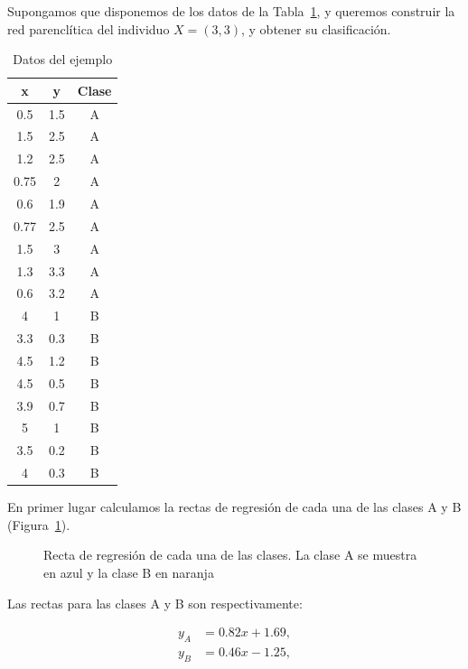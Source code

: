 \begin{ejemplo}
	Supongamos que disponemos de los datos de la Tabla~\ref{tbl:ejemploredparenclitica}, y queremos construir la red parenclítica del individuo $X = (3,3)$, y obtener su clasificación.\\
	
	\begin{table}[htbp!]
		\centering
		\caption{Datos del ejemplo}
		\label{tbl:ejemploredparenclitica}
		\begin{tabular}{@{}ccc@{}}
			\toprule
			x    & y   & Clase \\ \midrule
			0.5  & 1.5 & A     \\
			1.5  & 2.5 & A     \\
			1.2  & 2.5 & A     \\
			0.75 & 2   & A     \\
			0.6  & 1.9 & A     \\
			0.77 & 2.5 & A     \\
			1.5  & 3   & A     \\
			1.3  & 3.3 & A     \\
			0.6  & 3.2 & A     \\
			4    & 1   & B     \\
			3.3  & 0.3 & B     \\
			4.5  & 1.2 & B     \\
			4.5  & 0.5 & B     \\
			3.9  & 0.7 & B     \\
			5    & 1   & B     \\
			3.5  & 0.2 & B     \\
			4    & 0.3 & B     \\ \bottomrule
		\end{tabular}
	\end{table}
	
	En primer lugar calculamos la rectas de regresión de cada una de las clases A y B (Figura~\ref{fig:reg_rectas}).\\
	
	\begin{figure}[htbp!]
		\centering
		\regresionred
		\caption[Recta de regresión de cada una de las clases]{Recta de regresión de cada una de las clases. La clase A se muestra en azul y la clase B en naranja}
		\label{fig:reg_rectas}
	\end{figure}
	
	Las rectas para las clases A y B son respectivamente:
	
	\begin{align*}
	y_A & = 0.82x + 1.69, \\
	y_B & = 0.46x - 1.25,
	\end{align*}
	

\end{ejemplo}
